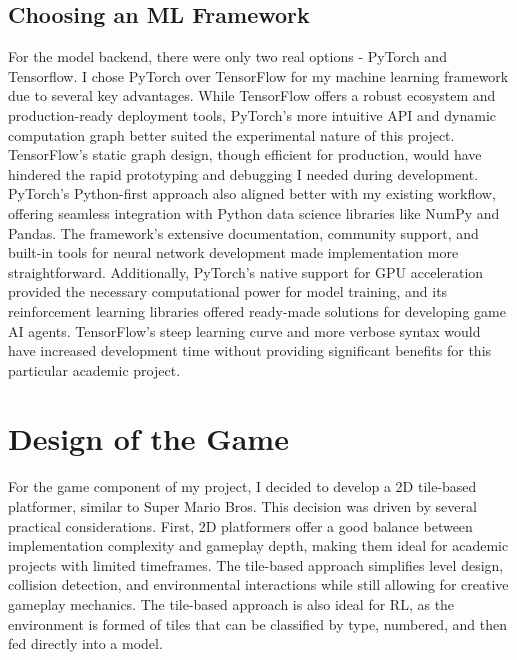 \subsection{Choosing an ML Framework}

For the model backend, there were only two real options - PyTorch and Tensorflow.
I chose PyTorch over TensorFlow for my machine learning framework due to several key advantages. 
While TensorFlow offers a robust ecosystem and production-ready deployment tools, PyTorch's more intuitive API and dynamic computation graph better suited the experimental nature of this project. 
TensorFlow's static graph design, though efficient for production, would have hindered the rapid prototyping and debugging I needed during development. 
PyTorch's Python-first approach also aligned better with my existing workflow, offering seamless integration with Python data science libraries like NumPy and Pandas. 
The framework's extensive documentation, community support, and built-in tools for neural network development made implementation more straightforward. 
Additionally, PyTorch's native support for GPU acceleration provided the necessary computational power for model training, and its reinforcement learning libraries offered ready-made solutions for developing game AI agents. 
TensorFlow's steep learning curve and more verbose syntax would have increased development time without providing significant benefits for this particular academic project.

\section{Design of the Game}

For the game component of my project, I decided to develop a 2D tile-based platformer, similar to Super Mario Bros. 
This decision was driven by several practical considerations. 
First, 2D platformers offer a good balance between implementation complexity and gameplay depth, making them ideal for academic projects with limited timeframes.
The tile-based approach simplifies level design, collision detection, and environmental interactions while still allowing for creative gameplay mechanics. 
The tile-based approach is also ideal for RL, as the environment is formed of tiles that can be classified by type, numbered, and then fed directly into a model.

